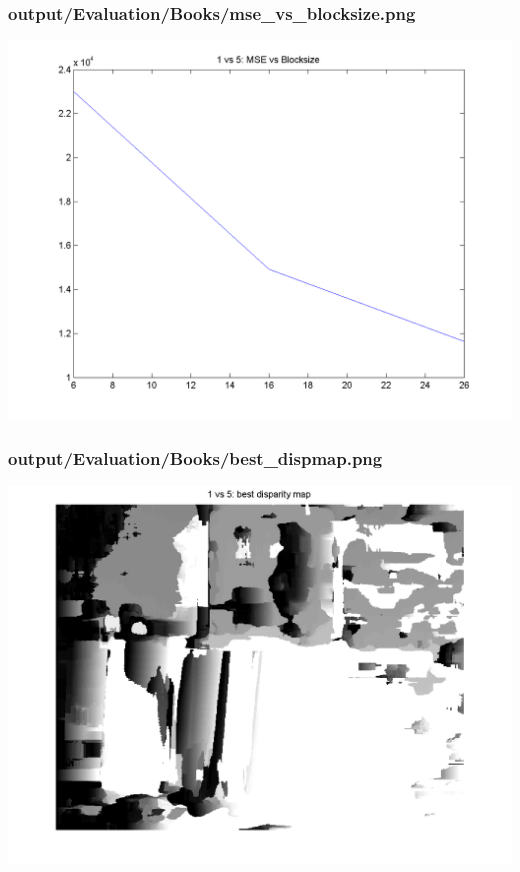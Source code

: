 \subsubsection{output/Evaluation/Books/mse\_vs\_blocksize.png}
    \includegraphics[scale=0.5]{output/Evaluation/Books/mse_vs_blocksize.png}

\subsubsection{output/Evaluation/Books/best\_dispmap.png}
    \includegraphics[scale=0.5]{output/Evaluation/Books/best_dispmap.png}

